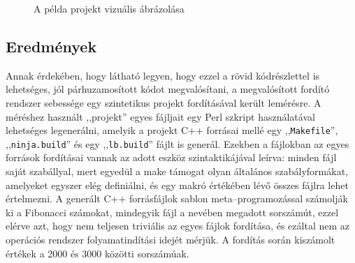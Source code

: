 \begin{figure}[htb]
	\caption{A példa projekt vizuális ábrázolása}
	\label{fig:lb-demo-graphic}
\end{figure}

\subsection{Eredmények}\label{sub:results}

Annak érdekében, hogy látható legyen, hogy ezzel a rövid kódrészlettel is lehetséges, jól párhuzamosított kódot megvalósítani, a megvalósított fordító rendszer sebessége egy szintetikus projekt fordításával került lemérésre.
A méréshez használt ,,projekt'' egyes fájljait egy Perl szkript használatával lehetséges legenerálni, amelyik a projekt C++ forrásai mellé egy ,,\texttt{Makefile}'', ,,\texttt{ninja.build}'' és egy ,,\texttt{lb.build}'' fájlt is generál.
Ezekben a fájlokban az egyes források fordításai vannak az adott eszköz szintaktikájával leírva: minden fájl saját szabállyal, mert egyedül a make támogat olyan általános szabályformákat, amelyeket egyszer elég definiálni, és egy makró értékében lévő összes fájlra lehet értelmezni.
A generált C++ forrásfájlok sablon meta--programozással számolják ki a Fibonacci számokat, mindegyik fájl a nevében megadott sorszámút, ezzel elérve azt, hogy nem teljesen triviális az egyes fájlok fordítása, és ezáltal nem az operációs rendszer folyamatindítási idejét mérjük.
A fordítás során kiszámolt értékek a 2000 és 3000 közötti sorszámúak.

